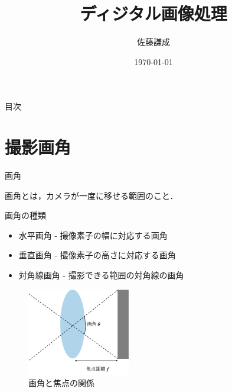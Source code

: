 \documentclass[8pt, jfont=ipaexm, t]{beamer} %
\title{ディジタル画像処理}
\institute{画像情報工学研究室}
\author{佐藤謙成}
\date{\today}
\begin{document}
\maketitle

\begin{frame}{目次}
    \tableofcontents
\end{frame}

\section{撮影画角}
\begin{frame}{画角}
  \begin{block}{}
    画角とは，カメラが一度に移せる範囲のこと．
  \end{block}
  \begin{block}{画角の種類}
    \begin{itemize}
      \item 水平画角 - 撮像素子の幅に対応する画角
      \item 垂直画角 - 撮像素子の高さに対応する画角
      \item 対角線画角 - 撮影できる範囲の対角線の画角
    \end{itemize}
  \end{block}
  \begin{figure}[H]
      \centering
      \includegraphics[width=0.4\textwidth]{figure/01.png}
      \caption{画角と焦点の関係}
      \label{fig:01}
  \end{figure}
\end{frame}
\end{document}
